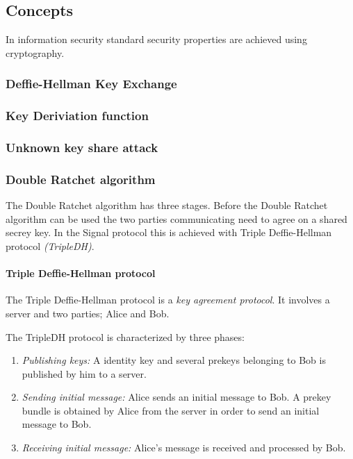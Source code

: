 \subsection{Concepts}
In information security standard security properties are achieved using cryptography.

 

\subsubsection{Deffie-Hellman Key Exchange}


\subsubsection{Key Deriviation function}

\subsubsection{Unknown key share attack}

\subsubsection{Double Ratchet algorithm}

The Double Ratchet algorithm has three stages. 
Before the Double Ratchet algorithm can be used the two parties communicating need to agree on a shared secrey key. In the Signal protocol this is achieved with Triple Deffie-Hellman protocol \emph{(TripleDH)}.

\paragraph{Triple Deffie-Hellman protocol}

The Triple Deffie-Hellman protocol is a \emph{key agreement protocol}. It involves a server and two parties; Alice and Bob. 

The TripleDH protocol is characterized by three phases:

\begin{enumerate}
	\item \emph{Publishing keys:} A identity key and several prekeys belonging to Bob is published by him to a server.
	\item \emph{Sending initial message:} Alice sends an initial message to Bob. A prekey bundle is obtained by Alice from the server in order to send an initial message to Bob.
	\item \emph{Receiving initial message:} Alice's message is received and processed by Bob.
\end{enumerate}

